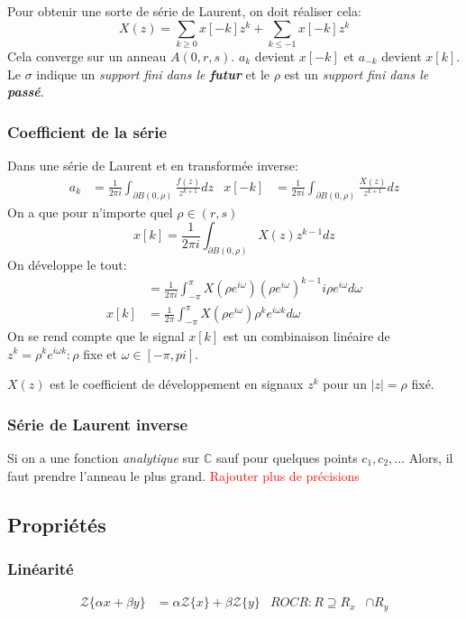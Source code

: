 \documentclass{report}
\begin{document}
Pour obtenir une sorte de série de Laurent, on doit réaliser cela:
\begin{equation}
X(z) = \sum_{k \geqslant 0} x[-k]z^k + \sum_{k \leqslant -1} x[-k] z^k
\end{equation}
Cela converge sur un anneau $A(0, r, s)$. $a_k$ devient $x[-k]$ et $a_{-k}$ devient $x[k]$. Le $\sigma$ indique un \textit{support fini dans le \textbf{futur}} et le $\rho$ est un \textit{support fini dans le \textbf{passé}}.

\subsubsection{Coefficient de la série}
Dans une série de Laurent et en transformée inverse:
\begin{align*}
a_k &= \frac{1}{2 \pi i} \int_{\partial B(0, \rho)} \frac{f(z)}{z^{k+1}} dz & x[-k] &= \frac{1}{2 \pi i} \int_{\partial B(0, \rho)} \frac{X(z)}{z^{k+1}} dz
\end{align*}
On a que pour n'importe quel $\rho \in (r,s)$
\begin{equation}
x[k] = \frac{1}{2 \pi i} \int_{\partial B(0, \rho)}X(z)z^{k-1} dz 
\end{equation}
On développe le tout:
\begin{align*}
& = \frac{1}{2 \pi i} \int_{- \pi}^{\pi} X(\rho e^{i \omega})(\rho e^{i \omega})^{k-1} i \rho e^{i \omega} d\omega\\
x[k] &= \frac{1}{2 \pi} \int_{- \pi}^{\pi} X(\rho e^{i \omega})\rho^k e^{i \omega k} d\omega
\end{align*}
On se rend compte que le signal $x[k]$ est un combinaison linéaire de $z^k = \rho^k e^{i \omega k} : \rho$ fixe et $\omega \in [-\pi, pi]$. \par
$X(z)$ est le coefficient de développement en signaux $z^k$ pour un $|z| = \rho$ fixé.

\subsubsection{Série de Laurent inverse} 
Si on a une fonction \textit{analytique} sur $\mathbb{C}$ sauf pour quelques points $c_1, c_2, ...$ Alors, il faut prendre l'anneau le plus grand.
\textcolor{red}{Rajouter plus de précisions}

\subsection{Propriétés}
\subsubsection{Linéarité}
\begin{align*}
\mathcal{Z}\{\alpha x + \beta y \} &= \alpha \mathcal{Z}\{x\} + \beta \mathcal{Z}\{y\} & ROC R: R \supseteq R_x &\cap R_y
\end{align*}
\end{document}
